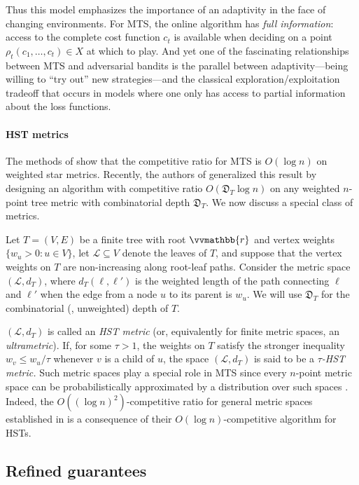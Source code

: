 \documentclass{toc}
\newcommand{\calL}{\mathcal L}
\newcommand{\depth}{\mathfrak{D}}
\newcommand{\vvr}{\vvmathbb{r}}
\begin{document}
Thus this model emphasizes the importance of
an adaptivity in the face of changing environments.
For MTS, the online algorithm has \emph{full information}: access to
the complete cost function $c_t$ is available when deciding on a point $\rho_t(c_1,\ldots,c_t) \in X$
at which to play.
And yet
one of the fascinating relationships 
between MTS and adversarial bandits is the parallel between
adaptivity---being willing to ``try out'' new strategies---and
the classical exploration/exploitation tradeoff that
occurs in models where one only has access to partial information about
the loss functions.

\paragraph{HST metrics}
The methods of \cite{BBN12} show that the competitive ratio for MTS is $O(\log n)$
on weighted star metrics.  Recently, the authors of \cite{BCLL19} generalized this
result by designing an algorithm with competitive ratio $O(\depth_T \log n)$
on any weighted $n$-point tree metric with combinatorial depth $\depth_T$.
We now discuss a special class of metrics.

Let $T=(V,E)$ be a finite tree with root $\vvr$ and vertex weights
$\{ w_u > 0 : u \in V\}$,
let $\calL \subseteq V$ denote the leaves of $T$,
and suppose that the vertex weights on $T$ are non-increasing along root-leaf paths.
Consider the metric space $(\calL,d_T)$, where $d_T(\ell,\ell')$ is the weighted length of the path connecting $\ell$ and $\ell'$ when the edge from a node $u$ to its parent is $w_u$.
We will use $\depth_T$ for the combinatorial (\ie, unweighted) depth of $T$.

$(\calL,d_T)$ is called an \emph{HST metric} (or, equivalently
for finite metric spaces, an \emph{ultrametric}).
If, for some $\tau > 1$, the weights on $T$ satisfy the stronger inequality $w_v \leq w_u/\tau$ whenever
$v$ is a child of $u$, the space $(\calL,d_T)$ is said to be a \emph{$\tau$-HST metric.}
Such metric spaces play a special role in MTS since every $n$-point
metric space can be probabilistically approximated by a distribution over
such spaces \cite{Bar96,FRT04}.  Indeed, the $O((\log n)^2)$-competitive ratio
for general metric spaces established in \cite{BCLL19} is a consequence
of their $O(\log n)$-competitive algorithm for HSTs.

\subsection{Refined guarantees}
\end{document}

